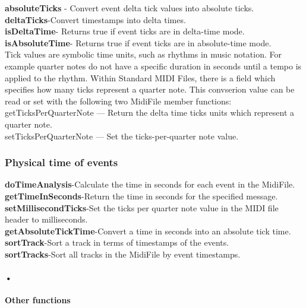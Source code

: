 \documentclass[12pt,a4paper]{article}
\begin{document}
 \textbf{absoluteTicks} - Convert event delta tick values into absolute ticks.\\
 \textbf{deltaTicks}-Convert timestamps into delta times.\\
\textbf{ isDeltaTime}- Returns true if event ticks are in delta-time mode.\\
\textbf{ isAbsoluteTime}- Returns true if event ticks are in absolute-time mode.\\

Tick values are symbolic time units, such as rhythms in music notation. For example quarter notes do not have a specific duration in seconds until a tempo is applied to the rhythm. Within Standard MIDI Files, there is a field which specifies how many ticks represent a quarter note. This convserion value can be read or set with the following two MidiFile member functions: \\

 getTicksPerQuarterNote — Return the delta time ticks units which represent a quarter note.\\
 setTicksPerQuarterNote — Set the ticks-per-quarter note value.\\


\subsubsection{Physical time of events}

  \textbf{doTimeAnalysis}-Calculate the time in seconds for each event in the MidiFile. \\
  \textbf{getTimeInSeconds}-Return the time in seconds for the specified message. \\
 \textbf{ setMillisecondTicks}-Set the ticks per quarter note value in the MIDI file header to milliseconds.\\
  \textbf{getAbsoluteTickTime}-Convert a time in seconds into an absolute tick time.\\
  \textbf{sortTrack}-Sort a track in terms of timestamps of the events.\\
  \textbf{sortTracks}-Sort all tracks in the MidiFile by event timestamps.

\paragraph{•}
\textbf{Other functions}
\end{document}
